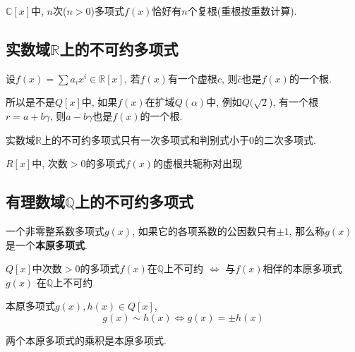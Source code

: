 \begin{Corollary}
$\mathbb{C}[x]$中, $n$次($n > 0$)多项式$f(x)$恰好有$n$个复根(重根按重数计算).
\end{Corollary}

\subsection{实数域$\mathbb{R}$上的不可约多项式}

\begin{Proposition}
设$f(x) = \sum\limits a_i x^i \in \mathbb{R}[x]$, 若$f(x)$有一个虚根$c$, 则$\bar{c}$也是$f(x)$的一个根.
\end{Proposition}

\begin{Thoughts}
所以是不是$Q[x]$中, 如果$f(x)$在扩域$Q(\alpha)$中, 例如$Q(\sqrt{2}$), 有一个根$r = a + b \gamma$, 则$a - b \gamma$也是$f(x)$的一个根.
\end{Thoughts}

\begin{Theorem}
实数域$\mathbb{R}$上的不可约多项式只有一次多项式和判别式小于$0$的二次多项式.
\end{Theorem}

\begin{Note}
$R[x]$中, 次数$> 0$的多项式$f(x)$的虚根共轭称对出现
\end{Note}

\subsection{有理数域$\mathbb{Q}$上的不可约多项式}

\begin{Definition}[本原多项式]
一个非零整系数多项式$g(x)$, 如果它的各项系数的公因数只有$\pm 1$, 那么称$g(x)$是一个\textbf{本原多项式}.
\end{Definition}

\begin{Note}
$Q[x]$中次数$> 0$的多项式$f(x)$在$\mathbb{Q}$上不可约 $\iff$ 与$f(x)$相伴的本原多项式$g(x)$ 在$\mathbb{Q}$上不可约
\end{Note}

\begin{Property}
本原多项式$g(x), h(x) \in Q[x]$, 
\[
g(x) \sim h(x) \iff g(x) = \pm h(x)
\]
\end{Property}

\begin{Property}[高斯引理]
两个本原多项式的乘积是本原多项式.
\end{Property}

